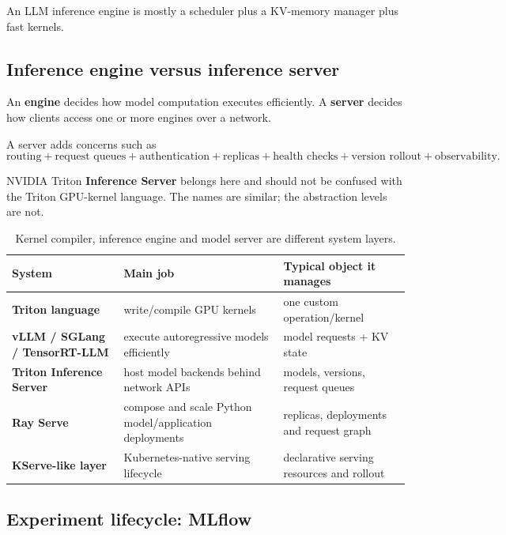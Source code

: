 \begin{calloutmemoryhook}
An LLM inference engine is mostly a scheduler plus a KV-memory manager plus fast kernels.
\end{calloutmemoryhook}


\subsection{Inference engine versus inference server}

An \textbf{engine} decides how model computation executes efficiently.
A \textbf{server} decides how clients access one or more engines over a network.

A server adds concerns such as
\[
\text{routing}
+
\text{request queues}
+
\text{authentication}
+
\text{replicas}
+
\text{health checks}
+
\text{version rollout}
+
\text{observability}.
\]

NVIDIA Triton \textbf{Inference Server} belongs here and should not be confused with the Triton GPU-kernel language.
The names are similar; the abstraction levels are not.

\begin{table}[ht]
\centering
\small
\begin{tabularx}{\textwidth}{>{\bfseries}p{3.0cm} X X}
\toprule
System & Main job & Typical object it manages \\
\midrule
Triton language & write/compile GPU kernels & one custom operation/kernel \\
vLLM / SGLang / TensorRT-LLM & execute autoregressive models efficiently & model requests + KV state \\
Triton Inference Server & host model backends behind network APIs & models, versions, request queues \\
Ray Serve & compose and scale Python model/application deployments & replicas, deployments and request graph \\
KServe-like layer & Kubernetes-native serving lifecycle & declarative serving resources and rollout \\
\bottomrule
\end{tabularx}
\caption{Kernel compiler, inference engine and model server are different system layers.}
\end{table}


\subsection{Experiment lifecycle: MLflow}

